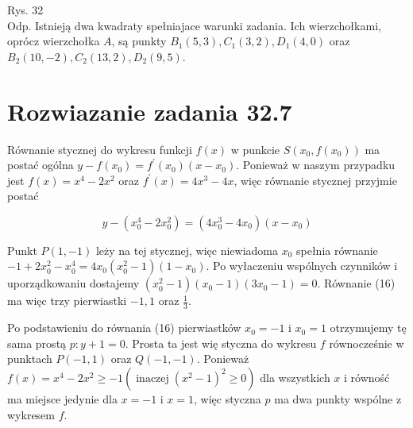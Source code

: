 \documentclass[10pt]{article}
\begin{document}
Rys. 32\\
Odp. Istnieją dwa kwadraty spełniajace warunki zadania. Ich wierzchołkami, oprócz wierzchołka $A$, są punkty $B_{1}(5,3), C_{1}(3,2), D_{1}(4,0)$ oraz $B_{2}(10,-2), C_{2}(13,2), D_{2}(9,5)$.

\section*{Rozwiazanie zadania 32.7}
Równanie stycznej do wykresu funkcji $f(x)$ w punkcie $S\left(x_{0}, f\left(x_{0}\right)\right)$ ma postać ogólna $y-f\left(x_{0}\right)=f^{\prime}\left(x_{0}\right)\left(x-x_{0}\right)$. Ponieważ w naszym przypadku\\
jest $f(x)=x^{4}-2 x^{2}$ oraz $f^{\prime}(x)=4 x^{3}-4 x$, więc równanie stycznej przyjmie postać

$$
y-\left(x_{0}^{4}-2 x_{0}^{2}\right)=\left(4 x_{0}^{3}-4 x_{0}\right)\left(x-x_{0}\right)
$$

Punkt $P(1,-1)$ leży na tej stycznej, więc niewiadoma $x_{0}$ spełnia równanie $-1+2 x_{0}^{2}-x_{0}^{4}=4 x_{0}\left(x_{0}^{2}-1\right)\left(1-x_{0}\right)$. Po wyłaczeniu wspólnych czynników i uporządkowaniu dostajemy $\left(x_{0}^{2}-1\right)\left(x_{0}-1\right)\left(3 x_{0}-1\right)=0$. Równanie (16) ma więc trzy pierwiastki $-1,1$ oraz $\frac{1}{3}$.

Po podstawieniu do równania (16) pierwiastków $x_{0}=-1$ i $x_{0}=1$ otrzymujemy tę sama prostą $p: y+1=0$. Prosta ta jest wię styczna do wykresu $f$ równocześnie w punktach $P(-1,1)$ oraz $Q(-1,-1)$. Ponieważ $f(x)=x^{4}-2 x^{2} \geq-1\left(\operatorname{inaczej}\left(x^{2}-1\right)^{2} \geq 0\right)$ dla wszystkich $x$ i równość ma miejsce jedynie dla $x=-1$ i $x=1$, więc styczna $p$ ma dwa punkty wspólne z wykresem $f$.
\end{document}
